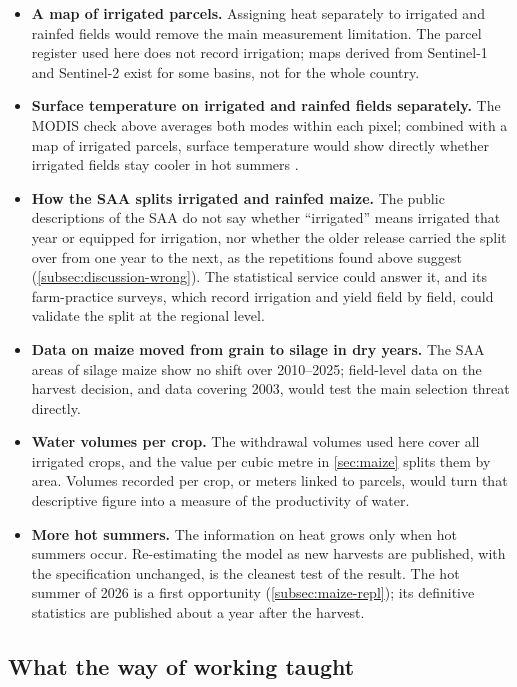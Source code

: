 \begin{itemize}
  \item \textbf{A map of irrigated parcels.} Assigning heat separately to irrigated and rainfed fields would remove the main measurement limitation. The parcel register used here does not record irrigation; maps derived from Sentinel-1 and Sentinel-2 exist for some basins, not for the whole country.
  \item \textbf{Surface temperature on irrigated and rainfed fields separately.} The MODIS check above averages both modes within each pixel; combined with a map of irrigated parcels, surface temperature would show directly whether irrigated fields stay cooler in hot summers \parencite{zhu2022}.
  \item \textbf{How the SAA splits irrigated and rainfed maize.} The public descriptions of the SAA do not say whether ``irrigated'' means irrigated that year or equipped for irrigation, nor whether the older release carried the split over from one year to the next, as the repetitions found above suggest (\cref{subsec:discussion-wrong}). The statistical service could answer it, and its farm-practice surveys, which record irrigation and yield field by field, could validate the split at the regional level.
  \item \textbf{Data on maize moved from grain to silage in dry years.} The SAA areas of silage maize show no shift over 2010--2025; field-level data on the harvest decision, and data covering 2003, would test the main selection threat directly.
  \item \textbf{Water volumes per crop.} The withdrawal volumes used here cover all irrigated crops, and the value per cubic metre in \cref{sec:maize} splits them by area. Volumes recorded per crop, or meters linked to parcels, would turn that descriptive figure into a measure of the productivity of water.
  \item \textbf{More hot summers.} The information on heat grows only when hot summers occur. Re-estimating the model as new harvests are published, with the specification unchanged, is the cleanest test of the result. The hot summer of 2026 is a first opportunity (\cref{subsec:maize-repl}); its definitive statistics are published about a year after the harvest.
\end{itemize}

\subsection{What the way of working taught}

